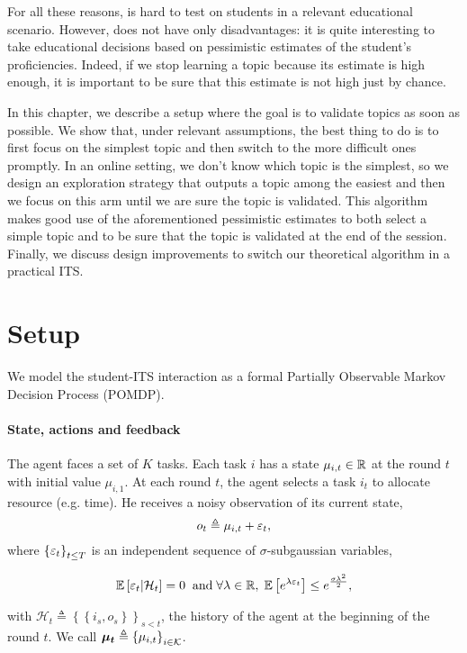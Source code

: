 For all these reasons, \RAWUCB is hard to test on students in a relevant educational scenario. However, \RAWUCB does not have only disadvantages: it is quite interesting to take educational decisions based on pessimistic estimates of the student's proficiencies. Indeed, if we stop learning a topic because its estimate is high enough, it is important to be sure that this estimate is not high just by chance. 

In this chapter, we describe a setup where the goal is to validate topics as soon as possible. We show that, under relevant assumptions, the best thing to do is to first focus on the simplest topic and then switch to the more difficult ones promptly. In an online setting, we don't know which topic is the simplest, so we design an exploration strategy that outputs a topic among the easiest and then we focus on this arm until we are sure the topic is validated. This algorithm makes good use of the aforementioned pessimistic estimates to both select a simple topic and to be sure that the topic is validated at the end of the session. Finally, we discuss design improvements to switch our theoretical algorithm in a practical ITS. 

\section{Setup}
\label{sec:setup}
We model the student-ITS interaction as a formal Partially Observable Markov Decision Process (POMDP). 
\paragraph{State, actions and feedback}
The agent faces a set of $K$ tasks. Each task $i$ has a state $\mu_{i,t}\in \mathbb{R}$ at the round $t$ with initial value $\mu_{i,1}$. At each round $t$, the agent selects a task $i_t$ to allocate resource (e.g. time). He receives a noisy observation of its current state,
\[ 
o_{t} \triangleq \mu_{i,t} + \varepsilon_t,
\]
where $\left\{\varepsilon_t\right\}_{t\leq T}$ is an independent sequence of $\sigma$-subgaussian variables, \ie

\[
\mathbb{E}\left[ \varepsilon_t | \mathcal{H}_t \right]= 0 \;\; \text{and} \; \forall \lambda \in \mathbb{R}, \; \mathbb{E}\left[ e^{\lambda\varepsilon_t}\right] \leq e^{\frac{\sigma\lambda^2}{2}},
\]

with $\mathcal{H}_t \triangleq \left\{ \left\{i_s,o_s   \right\}\right\}_{s < t}$, the history of the agent at the beginning of the round $t$. We call $\boldsymbol{\mu_t} \triangleq \left\{\mu_{i,t}\right\}_{i \in \mathcal{K}}$.

